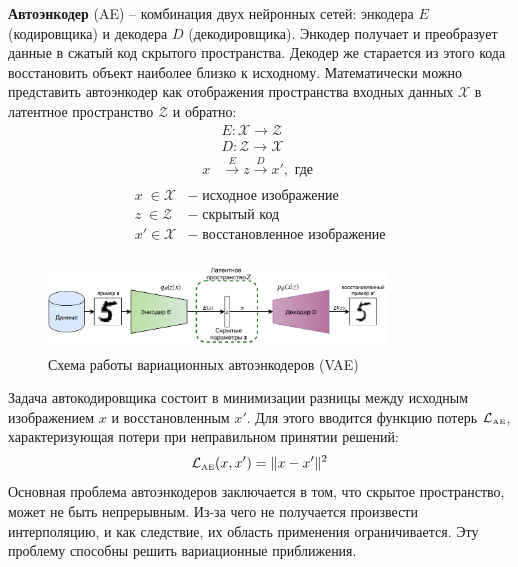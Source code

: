 \documentclass[11pt,a4paper]{extarticle}
\begin{document}
		\textbf{Автоэнкодер} (AE) -- комбинация двух нейронных сетей: энкодера $E$ (кодировщика) и декодера $D$ (декодировщика).
		Энкодер получает и преобразует данные в сжатый код скрытого пространства.
		Декодер же старается из этого кода восстановить объект наиболее близко к исходному.
		Математически можно представить автоэнкодер как отображения пространства входных данных $\mathcal{X}$ в латентное пространство $\mathcal{Z}$ и обратно:
		\begin{equation}
			\begin{aligned} 
				& E\!:{\mathcal{X}}\rightarrow {\mathcal{Z}} \\
				& D\!:{\mathcal{Z}}\rightarrow {\mathcal{X}} \\
				x& \xrightarrow[]{E} z \xrightarrow[]{D} x', \text{ где }
			\end{aligned}
		\end{equation}
		\begin{equation*}
			\begin{array}{ll}
				x\;\in \mathcal{X}&-\;\text{исходное изображение}\\
				z\;\in \mathcal{Z}&-\;\text{скрытый код}\\
				x' \in \mathcal{X}&-\;\text{восстановленное изображение}\\
			\end{array} 
		\end{equation*}

		\begin{figure}[ht]
			\centering
			\includegraphics[width=0.8\textwidth]{img/vae}
			\caption{Схема работы вариационных автоэнкодеров (VAE)}
			\label{pic:vae}
		\end{figure}
		\noindent
		Задача автокодировщика состоит в минимизации разницы между исходным изображением $x$ и восстановленным $x'$.
		Для этого вводится функцию потерь $\mathcal{L}_{\text{\tiny AE}}$, характеризующая потери при неправильном принятии решений:
		\begin{equation} \label{eq:ae}
			\mathcal{L}_{\text{\tiny AE}}(x,x') = \|x - x'\|^{2}
		\end{equation}
		Основная проблема автоэнкодеров заключается в том, что скрытое пространство, может не быть непрерывным.
		Из-за чего не получается произвести интерполяцию, и как следствие, их область применения ограничивается.
		Эту проблему способны решить вариационные приближения.
\end{document}
